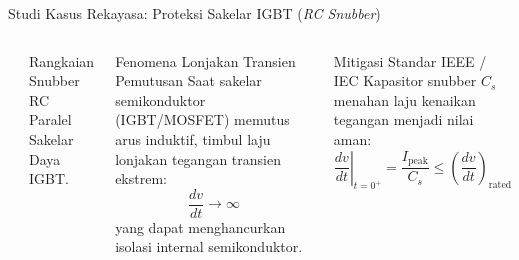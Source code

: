 \documentclass[aspectratio=169,10pt]{beamer}
\begin{document}
\begin{frame}{Studi Kasus Rekayasa: Proteksi Sakelar IGBT (\textit{RC Snubber})}
  \begin{columns}
    \begin{center}
    \end{center}
    \vspace{-0.2cm}
    \begin{center}
      \footnotesize Rangkaian Snubber RC Paralel Sakelar Daya IGBT.
    \end{center}

    \begin{block}{Fenomena Lonjakan Transien Pemutusan}
      Saat sakelar semikonduktor (IGBT/MOSFET) memutus arus induktif, timbul laju lonjakan tegangan transien ekstrem:
      \begin{equation*}
        \frac{dv}{dt} \to \infty
      \end{equation*}
      yang dapat menghancurkan isolasi internal semikonduktor.
    \end{block}
    \begin{exampleblock}{Mitigasi Standar IEEE / IEC}
      Kapasitor snubber $C_s$ menahan laju kenaikan tegangan menjadi nilai aman:
      \begin{equation*}
        \left.\frac{dv}{dt}\right|_{t=0^+} = \frac{I_{\text{peak}}}{C_s} \le \left(\frac{dv}{dt}\right)_{\text{rated}}
      \end{equation*}
    \end{exampleblock}
  \end{columns}
\end{frame}
\end{document}
